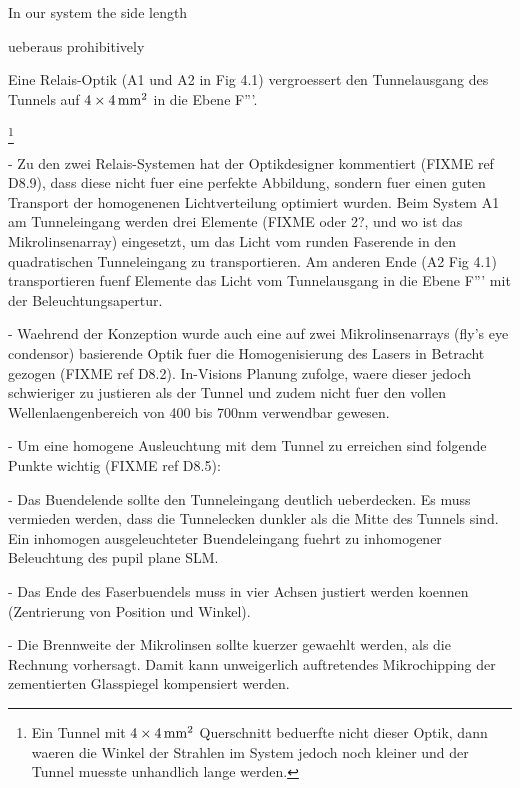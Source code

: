 In our system the side length 

ueberaus
prohibitively 

Eine Relais-Optik (A1
   und A2 in Fig 4.1) vergroessert
   den Tunnelausgang des Tunnels auf $\unit[4\times4]{mm^2}$
   in die Ebene F'''.

\footnote{Ein Tunnel mit $\unit[4\times4]{mm^2}$
   Querschnitt beduerfte nicht dieser Optik, dann waeren die Winkel
   der Strahlen im System jedoch noch kleiner und der Tunnel muesste
   unhandlich lange werden.} 




 - Zu den zwei Relais-Systemen hat der Optikdesigner kommentiert
   (FIXME ref D8.9), dass diese nicht fuer eine perfekte Abbildung,
   sondern fuer einen guten Transport der homogenenen Lichtverteilung    %
   optimiert wurden. Beim System A1 am Tunneleingang werden drei Elemente
   (FIXME oder 2?, und wo ist das Mikrolinsenarray) eingesetzt, um das
   Licht vom runden Faserende in den quadratischen Tunneleingang zu
   transportieren. Am anderen Ende (A2 Fig 4.1) transportieren fuenf Elemente das
   Licht vom Tunnelausgang in die Ebene F''' mit der
   Beleuchtungsapertur.

 - Waehrend der Konzeption wurde auch eine auf zwei Mikrolinsenarrays    %
   (fly's eye condensor) basierende Optik fuer die Homogenisierung des Lasers in
   Betracht gezogen (FIXME ref D8.2). In-Visions Planung zufolge,
   waere dieser jedoch schwieriger zu justieren als der Tunnel und
   zudem nicht fuer den vollen Wellenlaengenbereich von 400 bis 700nm
   verwendbar gewesen.

  - Um eine homogene Ausleuchtung mit dem Tunnel zu erreichen sind       %
    folgende Punkte wichtig (FIXME ref D8.5):

   - Das Buendelende sollte den Tunneleingang deutlich ueberdecken. Es
     muss vermieden werden, dass die Tunnelecken dunkler als die Mitte
     des Tunnels sind. Ein inhomogen ausgeleuchteter Buendeleingang
     fuehrt zu inhomogener Beleuchtung des pupil plane SLM.

   - Das Ende des Faserbuendels muss in vier Achsen justiert werden
     koennen (Zentrierung von Position und Winkel).

   - Die Brennweite der Mikrolinsen sollte kuerzer gewaehlt werden,
     als die Rechnung vorhersagt. Damit kann unweigerlich auftretendes
     Mikrochipping der zementierten Glasspiegel kompensiert werden.

